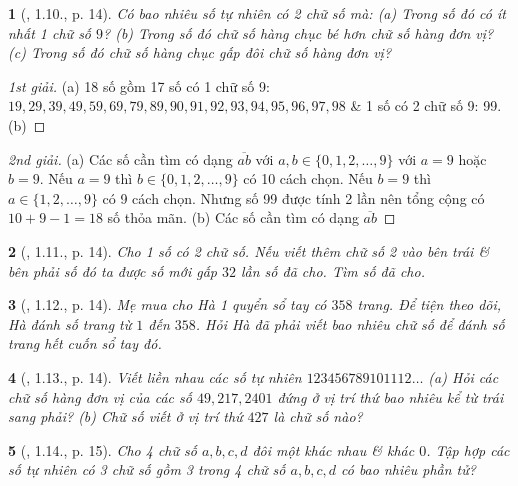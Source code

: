 \documentclass{article}
\newtheorem{baitoan}{}
\begin{document}
\begin{baitoan}[\cite{Binh_boi_duong_Toan_6_tap_1}, 1.10., p. 14]
	Có bao nhiêu số tự nhiên có 2 chữ số mà: (a) Trong số đó có ít nhất 1 chữ số $9$? (b) Trong số đó chữ số hàng chục bé hơn chữ số hàng đơn vị? (c) Trong số đó chữ số hàng chục gấp đôi chữ số hàng đơn vị?
\end{baitoan}

\begin{proof}[1st giải]
	(a) 18 số gồm 17 số có 1 chữ số 9: $19,29,39,49,59,69,79,89,90,91,92,93,94,95,96,97,98$ \& 1 số có 2 chữ số 9: 99. (b) 
\end{proof}

\begin{proof}[2nd giải]
	(a) Các số cần tìm có dạng $\overline{ab}$ với $a,b\in\{0,1,2,\ldots,9\}$ với $a = 9$ hoặc $b = 9$. Nếu $a = 9$ thì $b\in\{0,1,2,\ldots,9\}$ có 10 cách chọn. Nếu $b = 9$ thì $a\in\{1,2,\ldots,9\}$ có 9 cách chọn. Nhưng số 99 được tính 2 lần nên tổng cộng có $10 + 9 - 1 = 18$ số thỏa mãn. (b) Các số cần tìm có dạng $\overline{ab}$
\end{proof}

\begin{baitoan}[\cite{Binh_boi_duong_Toan_6_tap_1}, 1.11., p. 14]
	Cho 1 số có 2 chữ số. Nếu viết thêm chữ số 2 vào bên trái \& bên phải số đó ta được số mới gấp $32$ lần số đã cho. Tìm số đã cho.
\end{baitoan}

\begin{baitoan}[\cite{Binh_boi_duong_Toan_6_tap_1}, 1.12., p. 14]
	Mẹ mua cho Hà 1 quyển sổ tay có $358$ trang. Để tiện theo dõi, Hà đánh số trang từ $1$ đến $358$. Hỏi Hà đã phải viết bao nhiêu chữ số để đánh số trang hết cuốn sổ tay đó.
\end{baitoan}

\begin{baitoan}[\cite{Binh_boi_duong_Toan_6_tap_1}, 1.13., p. 14]
	Viết liền nhau các số tự nhiên $123456789101112\ldots$ (a) Hỏi các chữ số hàng đơn vị của các số $49,217,2401$ đứng ở vị trí thứ bao nhiêu kể từ trái sang phải? (b) Chữ số viết ở vị trí thứ $427$ là chữ số nào?
\end{baitoan}

\begin{baitoan}[\cite{Binh_boi_duong_Toan_6_tap_1}, 1.14., p. 15]
	Cho 4 chữ số $a,b,c,d$ đôi một khác nhau \& khác $0$. Tập hợp các số tự nhiên có 3 chữ số gồm 3 trong 4 chữ số $a,b,c,d$ có bao nhiêu phần tử?
\end{baitoan}
\end{document}
